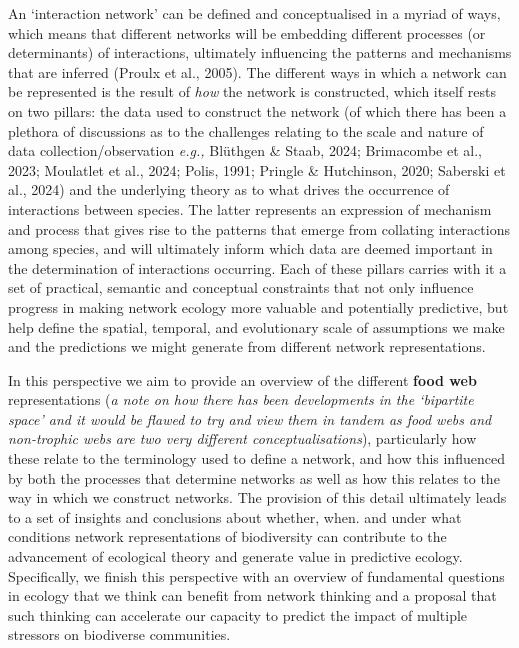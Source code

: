 \documentclass[
]{article}
\begin{document}
An `interaction network' can be defined and conceptualised in a myriad
of ways, which means that different networks will be embedding different
processes (or determinants) of interactions, ultimately influencing the
patterns and mechanisms that are inferred (Proulx et al., 2005). The
different ways in which a network can be represented is the result of
\emph{how} the network is constructed, which itself rests on two
pillars: the data used to construct the network (of which there has been
a plethora of discussions as to the challenges relating to the scale and
nature of data collection/observation \emph{e.g.,} Blüthgen \& Staab,
2024; Brimacombe et al., 2023; Moulatlet et al., 2024; Polis, 1991;
Pringle \& Hutchinson, 2020; Saberski et al., 2024) and the underlying
theory as to what drives the occurrence of interactions between species.
The latter represents an expression of mechanism and process that gives
rise to the patterns that emerge from collating interactions among
species, and will ultimately inform which data are deemed important in
the determination of interactions occurring. Each of these pillars
carries with it a set of practical, semantic and conceptual constraints
that not only influence progress in making network ecology more valuable
and potentially predictive, but help define the spatial, temporal, and
evolutionary scale of assumptions we make and the predictions we might
generate from different network representations.

In this perspective we aim to provide an overview of the different
\textbf{food web} representations (\emph{a note on how there has been
developments in the `bipartite space' and it would be flawed to try and
view them in tandem as food webs and non-trophic webs are two very
different conceptualisations}), particularly how these relate to the
terminology used to define a network, and how this influenced by both
the processes that determine networks as well as how this relates to the
way in which we construct networks. The provision of this detail
ultimately leads to a set of insights and conclusions about whether,
when. and under what conditions network representations of biodiversity
can contribute to the advancement of ecological theory and generate
value in predictive ecology. Specifically, we finish this perspective
with an overview of fundamental questions in ecology that we think can
benefit from network thinking and a proposal that such thinking can
accelerate our capacity to predict the impact of multiple stressors on
biodiverse communities.
\end{document}
